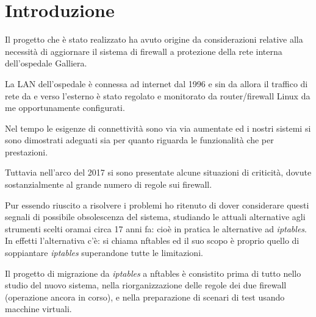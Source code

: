 

\chapter{Introduzione} %

\label{Chapter1} %


\newcommand{\keyword}[1]{\textbf{#1}}
\newcommand{\tabhead}[1]{\textbf{#1}}
\newcommand{\code}[1]{\texttt{#1}}
\newcommand{\file}[1]{\texttt{\bfseries#1}}
\newcommand{\option}[1]{\texttt{\itshape#1}}


Il progetto che \`e stato realizzato ha avuto origine da considerazioni
relative alla necessit\`a di aggiornare il sistema di firewall a protezione
della rete interna dell'ospedale Galliera.

La LAN dell'ospedale \`e connessa ad internet dal 1996 e sin da allora il
traffico di rete da e verso l'esterno \`e stato regolato e monitorato da
router/firewall Linux da me opportunamente configurati.

Nel tempo le esigenze di connettivit\`a sono via via aumentate ed i nostri
sistemi si sono dimostrati adeguati sia per quanto riguarda le funzionalit\`a
che per prestazioni.

Tuttavia nell'arco del 2017 si sono presentate alcune situazioni di
criticit\`a, dovute sostanzialmente al grande numero di regole sui firewall.

Pur essendo riuscito a risolvere i problemi ho ritenuto di dover considerare
questi segnali di possibile obsolescenza del sistema, studiando le attuali
alternative agli strumenti scelti oramai circa 17 anni fa: cio\`e in pratica
le alternative ad {\em iptables}.  In effetti l'alternativa c'\`e: si chiama
nftables ed il suo scopo è proprio quello di soppiantare {\em iptables}
superandone tutte le limitazioni.

Il progetto di migrazione da {\em iptables} a nftables \`e consistito prima di
tutto nello studio del nuovo sistema, nella riorganizzazione delle regole dei
due firewall (operazione ancora in corso), e nella preparazione di scenari di
test usando macchine virtuali.

